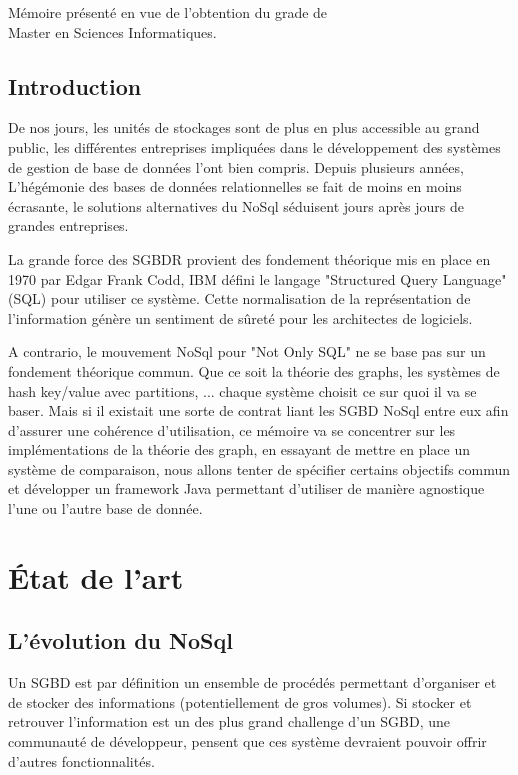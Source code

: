 \documentclass[a4paper,fleqn,12pt]{report}
\begin{document}
\vspace{0.5cm}
\begin{center}
M\'emoire pr\'esent\'e en vue de l'obtention du grade de\\
Master en Sciences Informatiques.
\end{center}
\tableofcontents
\newpage


\chapter*{Introduction}

De nos jours, les unités de stockages sont de plus en plus accessible au grand public, les différentes entreprises impliquées dans le développement des systèmes de gestion de base de données l'ont bien compris. Depuis plusieurs années, L'hégémonie des bases de données relationnelles se fait de moins en moins écrasante, le solutions alternatives du NoSql séduisent jours après jours de grandes entreprises. 

La grande force des SGBDR provient des fondement théorique mis en place en 1970 par Edgar Frank Codd, IBM défini le langage "Structured Query Language" (SQL) pour utiliser ce système. Cette normalisation de la représentation de l'information génère un sentiment de sûreté pour les architectes de logiciels.

A contrario, le mouvement NoSql pour "Not Only SQL" ne se base pas sur un fondement théorique commun. Que ce soit la théorie des graphs, les systèmes de hash key/value avec partitions, ... chaque système choisit ce sur quoi il va se baser. Mais si il existait une sorte de contrat liant les SGBD NoSql entre eux afin d'assurer une cohérence d'utilisation, ce mémoire va se concentrer sur les implémentations de la théorie des graph, en essayant de mettre en place un système de comparaison, nous allons tenter de spécifier certains objectifs commun et développer un framework Java permettant d'utiliser de manière agnostique l'une ou l'autre base de donnée.
 
\part{État de l'art}

\chapter{L'évolution du NoSql}


Un SGBD est par définition un ensemble de procédés permettant d'organiser et de stocker des informations (potentiellement de gros volumes). Si stocker et retrouver l'information est un des plus grand challenge d'un SGBD, une communauté de développeur, pensent que ces système devraient pouvoir offrir d'autres fonctionnalités. 
\end{document}
